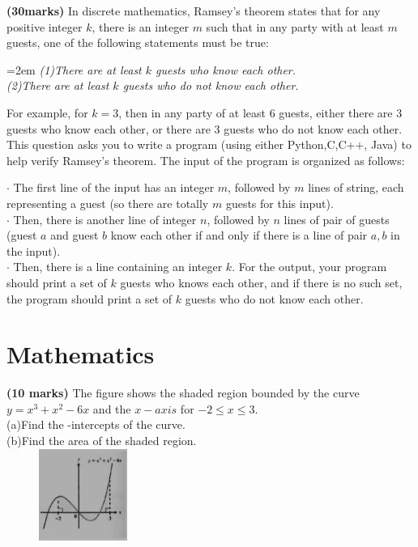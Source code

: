 \documentclass{article}
\begin{document}
\vspace{2\baselineskip}

\noindent \textbf{(30marks)} In discrete mathematics, Ramsey's theorem states that for any positive integer $k$, there is an integer $m$ such that in any party with at least $m$ guests, one of the following statements must be true:

\hangindent=2em %
\textit{(1)There are at least $k$ guests who know each other.}\\
\textit{(2)There are at least $k$ guests who do not know each other.}

For example, for $k=3$, then in any party of at least 6 guests, either there are 3 guests who know each other, or there are 3 guests who do not know each other. This question asks you to write a program (using either Python,C,C++, Java) to help verify Ramsey's theorem. The input of the program is organized as follows:


\indent $\cdot$ The first line of the input has an integer $m$, followed by $m$ lines of string, each representing a guest (so there are totally $m$ guests for this input).\\
\indent $\cdot$ Then, there is another line of integer $n$, followed by $n$ lines of pair of guests (guest $a$ and guest $b$ know each other if and only if there is a line of pair $a, b$ in the input).\\
\indent $\cdot$ Then, there is a line containing an integer $k$.
For the output, your program should print a set of $k$ guests who knows each other, and if there is no such set, the program should print a set of $k$ guests who do not know each other.\\



\section{Mathematics}

\noindent \textbf{(10 marks)} The figure shows the shaded region bounded by the curve $y=x^3+x^2-6x$ and the $x-axis$ for $-2 \le x \le 3$.\\
\indent (a)Find the -intercepts of the curve.\\
\indent (b)Find the area of the shaded region.\\ 

\hfill
\includegraphics[width=5cm, height=3cm]{graph1.jpg}
\end{document}
